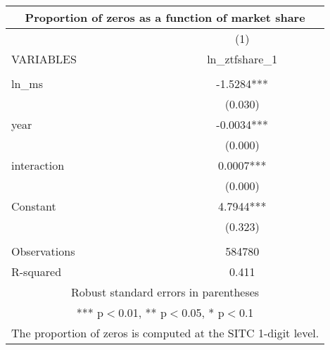 \begin{tabular}{lc}
\multicolumn{2}{c}{Proportion of zeros as a function of market share} \\ \hline
 & (1) \\
VARIABLES & ln\_ztfshare\_1 \\ \hline
 &  \\
ln\_ms & -1.5284*** \\
 & (0.030) \\
year & -0.0034*** \\
 & (0.000) \\
interaction & 0.0007*** \\
 & (0.000) \\
Constant & 4.7944*** \\
 & (0.323) \\
 &  \\
Observations & 584780 \\
 R-squared & 0.411 \\ \hline
\multicolumn{2}{c}{ Robust standard errors in parentheses} \\
\multicolumn{2}{c}{ *** p$<$0.01, ** p$<$0.05, * p$<$0.1} \\
\multicolumn{2}{c}{ The proportion of zeros is computed at the SITC 1-digit level.} \\
\end{tabular}
